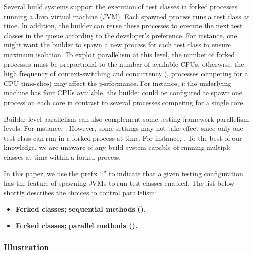 Several build systems support the execution of test classes in forked
processes running a Java virtual machine (JVM). Each spawned process
runs a test class at time. In addition, the builder can reuse these
processes to execute the next test classes in the queue according to
the developer's preference. For instance, one might want the builder
to spawn a new process for each test class to ensure maximum
isolation.  To exploit parallelism at this level, the number of forked
processes must be proportional to the number of available CPUs,
otherwise, the high frequency of context-switching and concurrency
(\ie, processes competing for a CPU time-slice) may affect the
performance.  For instance, if the underlying machine has four CPUs
available, the builder could be configured to spawn one process on
each core in contrast to several processes competing for a single
core.

Builder-level parallelism can also complement some testing framework
parallelism levels. For instance, .  However, some
settings may not take effect since only one test class can run in a
forked process at time. For instance, . To the best
of our knowledge, we are unaware of any build system capable of
running multiple classes at time within a forked process.

In this paper, we use the prefix ``\Fork{}'' to indicate that a given
testing configuration has the feature of spawning JVMs to run test
classes enabled. The list below shortly describes the choices to
control parallelism:

\begin{itemize}
\item
    \textbf{Forked classes; sequential methods (\ForkSeq).}~
\item
    \textbf{Forked classes; parallel methods (\ForkParMeth).}~
\end{itemize}

\subsubsection*{Illustration}~


